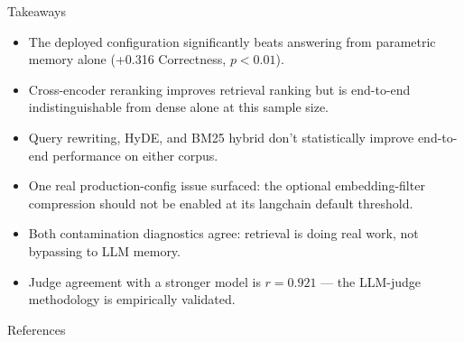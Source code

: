 \documentclass[10pt,aspectratio=169,xcolor={table}]{beamer}
\begin{document}
\begin{frame}{Takeaways}
  \begin{itemize}
    \item The deployed configuration significantly beats answering from
          parametric memory alone (+0.316 Correctness, $p < 0.01$).
    \item Cross-encoder reranking improves retrieval ranking but is
          end-to-end indistinguishable from dense alone at this sample size.
    \item Query rewriting, HyDE, and BM25 hybrid don't statistically improve
          end-to-end performance on either corpus.
    \item One real production-config issue surfaced: the optional
          embedding-filter compression should not be enabled at its
          langchain default threshold.
    \item Both contamination diagnostics agree: retrieval is doing real work,
          not bypassing to LLM memory.
    \item Judge agreement with a stronger model is $r = 0.921$ ---
          the LLM-judge methodology is empirically validated.
  \end{itemize}
\end{frame}

\begin{frame}[allowframebreaks]{References}
  \footnotesize
  \nocite{*}
  \printbibliography[heading=none]
\end{frame}
\end{document}
